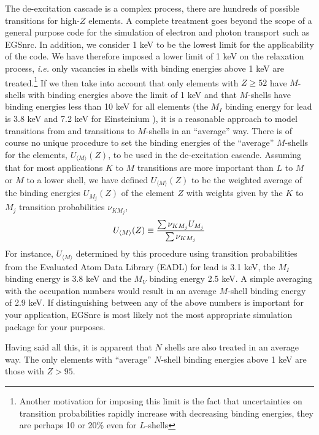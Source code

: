 The de-excitation cascade is a complex process, there are 
hundreds of possible transitions for high-$Z$ elements. 
A complete treatment goes beyond the scope of a general 
purpose code for the simulation of electron and photon transport 
such as EGSnrc. In addition, we consider 1 keV to be the lowest 
limit for the applicability of the code. We have therefore imposed 
a lower limit of 1 keV on the relaxation process, {\em i.e.} only 
vacancies in shells with binding energies 
above 1 keV are treated.\footnote{Another motivation 
for imposing this limit is the fact that uncertainties on 
transition probabilities rapidly increase with 
decreasing binding energies, they are perhaps 10 or 20\% 
even for $L$-shells} If we then take into account that 
only elements with $Z \ge 52$ have $M$-shells with binding energies 
above the limit of 1 keV and that $M$-shells have binding energies less 
than 10 keV for all elements (the $M_I$ binding energy for 
lead is 3.8 keV and 7.2 keV for Einsteinium \cite{Pe91}), 
it is a reasonable approach to model transitions from and 
transitions to $M$-shells in an ``average'' way. 
There is of course no unique procedure to set the binding energies of the 
``average'' $M$-shells for the elements, $U_{\langle M \rangle}(Z)$,  
to be used in the de-excitation cascade. 
Assuming that for most applications $K$ to $M$ transitions 
are more important than $L$ to $M$ or $M$ to a lower shell, 
we have defined $U_{\langle M \rangle}(Z)$ to be the weighted average
of the binding energies $U_{M_j}(Z)$ of the element $Z$ with 
weights given by the $K$ to $M_j$ transition probabilities $\nu_{KM_j}$,  
\begin{equation}
U_{\langle M \rangle}(Z) \equiv {\sum \nu_{KM_j} U_{M_j} \over 
\sum \nu_{KM_j}}
\end{equation}
For instance, $U_{\langle M \rangle}$ determined by this 
procedure using transition probabilities from the 
Evaluated Atom Data Library (EADL) \cite{Pe91} for lead 
is 3.1 keV, the $M_I$ binding energy is 3.8 keV and the 
$M_V$ binding energy 2.5 keV. A simple averaging with the 
occupation numbers would result in an average $M$-shell binding 
energy of 2.9 keV. If distinguishing between any of the above 
numbers is important for your application, EGSnrc is most 
likely not the most appropriate simulation package for 
your purposes. 

Having said all this, it is apparent that $N$ shells are 
also treated in an average way. The only elements with 
``average'' $N$-shell binding energies above 1 keV are those with $Z > 95$. 

